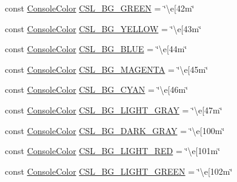 \begin{DoxyCompactItemize}
\item 
const \mbox{\hyperlink{namespaceo_a_a747e07c1977a29f3e1d38683043ec927}{Console\+Color}} \mbox{\hyperlink{namespaceo_a_a59048e89758e96024d865d80540b1174}{C\+S\+L\+\_\+\+B\+G\+\_\+\+G\+R\+E\+EN}} = \char`\"{}\textbackslash{}e\mbox{[}42m\char`\"{}
\item 
const \mbox{\hyperlink{namespaceo_a_a747e07c1977a29f3e1d38683043ec927}{Console\+Color}} \mbox{\hyperlink{namespaceo_a_afd1d3d1465a442f991555b2444ba8238}{C\+S\+L\+\_\+\+B\+G\+\_\+\+Y\+E\+L\+L\+OW}} = \char`\"{}\textbackslash{}e\mbox{[}43m\char`\"{}
\item 
const \mbox{\hyperlink{namespaceo_a_a747e07c1977a29f3e1d38683043ec927}{Console\+Color}} \mbox{\hyperlink{namespaceo_a_a66471ac118ea9f366ec5c59b76e3b166}{C\+S\+L\+\_\+\+B\+G\+\_\+\+B\+L\+UE}} = \char`\"{}\textbackslash{}e\mbox{[}44m\char`\"{}
\item 
const \mbox{\hyperlink{namespaceo_a_a747e07c1977a29f3e1d38683043ec927}{Console\+Color}} \mbox{\hyperlink{namespaceo_a_a12d025415b1533f4f68f1676b4a840d4}{C\+S\+L\+\_\+\+B\+G\+\_\+\+M\+A\+G\+E\+N\+TA}} = \char`\"{}\textbackslash{}e\mbox{[}45m\char`\"{}
\item 
const \mbox{\hyperlink{namespaceo_a_a747e07c1977a29f3e1d38683043ec927}{Console\+Color}} \mbox{\hyperlink{namespaceo_a_a4c09ea533ef579d743564c9954bef420}{C\+S\+L\+\_\+\+B\+G\+\_\+\+C\+Y\+AN}} = \char`\"{}\textbackslash{}e\mbox{[}46m\char`\"{}
\item 
const \mbox{\hyperlink{namespaceo_a_a747e07c1977a29f3e1d38683043ec927}{Console\+Color}} \mbox{\hyperlink{namespaceo_a_a281fe48751361891bb8e0a902e368b4b}{C\+S\+L\+\_\+\+B\+G\+\_\+\+L\+I\+G\+H\+T\+\_\+\+G\+R\+AY}} = \char`\"{}\textbackslash{}e\mbox{[}47m\char`\"{}
\item 
const \mbox{\hyperlink{namespaceo_a_a747e07c1977a29f3e1d38683043ec927}{Console\+Color}} \mbox{\hyperlink{namespaceo_a_abd7630c4dc18fb584e189008f40e5537}{C\+S\+L\+\_\+\+B\+G\+\_\+\+D\+A\+R\+K\+\_\+\+G\+R\+AY}} = \char`\"{}\textbackslash{}e\mbox{[}100m\char`\"{}
\item 
const \mbox{\hyperlink{namespaceo_a_a747e07c1977a29f3e1d38683043ec927}{Console\+Color}} \mbox{\hyperlink{namespaceo_a_a11ee2c7f52c5050f321ff8b18b6b1209}{C\+S\+L\+\_\+\+B\+G\+\_\+\+L\+I\+G\+H\+T\+\_\+\+R\+ED}} = \char`\"{}\textbackslash{}e\mbox{[}101m\char`\"{}
\item 
const \mbox{\hyperlink{namespaceo_a_a747e07c1977a29f3e1d38683043ec927}{Console\+Color}} \mbox{\hyperlink{namespaceo_a_aa9816e5e60e0e90eff3f1dc6222a9a69}{C\+S\+L\+\_\+\+B\+G\+\_\+\+L\+I\+G\+H\+T\+\_\+\+G\+R\+E\+EN}} = \char`\"{}\textbackslash{}e\mbox{[}102m\char`\"{}

\end{DoxyCompactItemize}
